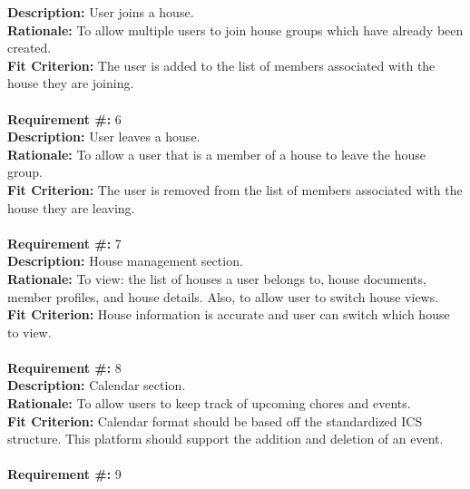 \documentclass[12pt]{article}
\begin{document}
      \textbf{Description:} User joins a house. \\
      \textbf{Rationale:} To allow multiple users to join house groups which
      have already been created. \\
      \textbf{Fit Criterion:} The user is added to the list of members
      associated with the house they are joining. \\ \\
\textbf{Requirement \#:} 6
       \\
      \textbf{Description:} User leaves a house. \\
      \textbf{Rationale:} To allow a user that is a member of a house to leave the house group. \\
      \textbf{Fit Criterion:} The user is removed from the list of members
      associated with the house they are leaving. \\ \\
\textbf{Requirement \#:} 7
       \\
      \textbf{Description:} House management section. \\
      \textbf{Rationale:} To view: the list of houses a user belongs to, house documents, member profiles, and house details. Also, to allow user to switch house views.\\
      \textbf{Fit Criterion:} House information is accurate and user can switch which house to view. \\ \\
\textbf{Requirement \#:} 8
       \\
      \textbf{Description: }{Calendar section.} \\
      \textbf{Rationale: }{To allow users to keep track of upcoming chores and events.} \\
      \textbf{Fit Criterion: }{Calendar format should be based off the 
standardized ICS structure. This platform should support the addition and deletion of an event.} \\ \\
\textbf{Requirement \#:} 9
\end{document}
